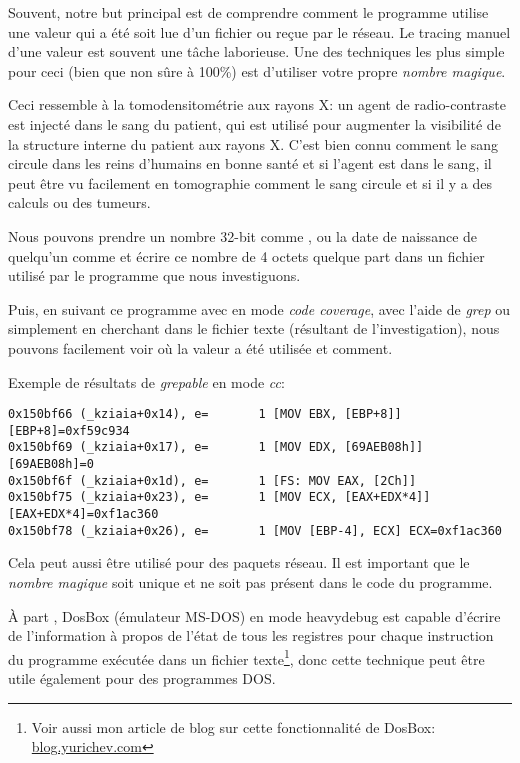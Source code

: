 
Souvent, notre but principal est de comprendre comment le programme utilise une valeur
qui a été soit lue d'un fichier ou reçue par le réseau. Le tracing manuel d'une valeur
est souvent une tâche laborieuse. Une des techniques les plus simple pour ceci (bien
que non sûre à 100\%) est d'utiliser votre propre \emph{nombre magique}.

Ceci ressemble à la tomodensitométrie aux rayons X: un agent de radio-contraste est
injecté dans le sang du patient, qui est utilisé pour augmenter la visibilité de
la structure interne du patient aux rayons X.
C'est bien connu comment le sang circule dans les reins d'humains en bonne santé
et si l'agent est dans le sang, il peut être vu facilement en tomographie comment
le sang circule et si il y a des calculs ou des tumeurs.

Nous pouvons prendre un nombre 32-bit comme , ou la date de naissance
de quelqu'un comme  et écrire ce nombre de 4 octets quelque part dans
un fichier utilisé par le programme que nous investiguons.

\myindex{\GrepUsage}

Puis, en suivant ce programme avec \tracer en mode \emph{code coverage}, avec l'aide
de \emph{grep} ou simplement en cherchant dans le fichier texte (résultant de l'investigation),
nous pouvons facilement voir où la valeur a été utilisée et comment.

Exemple de résultats de \tracer \emph{grepable} en mode \emph{cc}:

\begin{lstlisting}[style=customasmx86]
0x150bf66 (_kziaia+0x14), e=       1 [MOV EBX, [EBP+8]] [EBP+8]=0xf59c934
0x150bf69 (_kziaia+0x17), e=       1 [MOV EDX, [69AEB08h]] [69AEB08h]=0
0x150bf6f (_kziaia+0x1d), e=       1 [FS: MOV EAX, [2Ch]]
0x150bf75 (_kziaia+0x23), e=       1 [MOV ECX, [EAX+EDX*4]] [EAX+EDX*4]=0xf1ac360
0x150bf78 (_kziaia+0x26), e=       1 [MOV [EBP-4], ECX] ECX=0xf1ac360
\end{lstlisting}

Cela peut aussi être utilisé pour des paquets réseau.
Il est important que le \emph{nombre magique} soit unique et ne soit pas présent
dans le code du programme.

\newcommand{\DOSBOXURL}{\href{http://blog.yurichev.com/node/55}{blog.yurichev.com}}

À part \tracer, DosBox (émulateur MS-DOS) en mode heavydebug est capable d'écrire
de l'information à propos de l'état de tous les registres pour chaque instruction
du programme exécutée dans un fichier texte\footnote{Voir aussi mon article de blog
sur cette fonctionnalité de DosBox: \DOSBOXURL{}}, donc cette technique peut être
utile également pour des programmes DOS.
